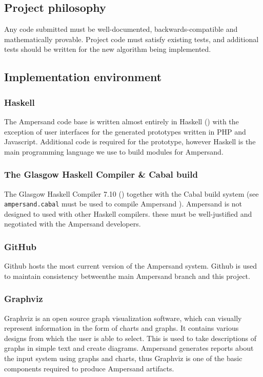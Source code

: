 \documentclass[12pt]{report}
\begin{document}
\subsection{Project philosophy}

Any code submitted must be well-documented, backwards-compatible and 
mathematically provable. Project code must satisfy existing tests, and 
additional tests should be written for the new algorithm being implemented. 


\subsection{Implementation environment}\label{subsec:ImplementationEnvironment}
\subsubsection*{Haskell}
The Ampersand code base is written almost entirely in Haskell 
(\cite{ampSource}) with the exception of user interfaces for the generated 
prototypes written in PHP and Javascript. Additional code is required for the 
prototype, however Haskell is the main programming 
language we use to build modules for Ampersand. 

\subsubsection*{The Glasgow Haskell Compiler \& Cabal build}\label{GHC}
The Glasgow Haskell Compiler 7.10 (\cite{GHC}) together with the Cabal build 
system (see \verb|ampersand.cabal| must be used to compile Ampersand 
\cite{ampSource}). Ampersand is not designed to used with other Haskell 
compilers.
  these must be well-justified and negotiated with the Ampersand developers.


\subsubsection*{GitHub}\label{Github}
Github hosts the most current version of the Ampersand system. Github is used 
to maintain consistency betweenthe main Ampersand branch and this project.
%

\subsubsection*{Graphviz}
Graphviz is an open source graph visualization software, which can
visually represent information in the form of charts and graphs. It contains
various designs from which the user is able to select. This is used to take
descriptions of graphs in simple text and create diagrams. Ampersand generates
reports about the input system using graphs and charts, thus Graphviz is one of 
the basic components required to produce Ampersand artifacts.
\end{document}
